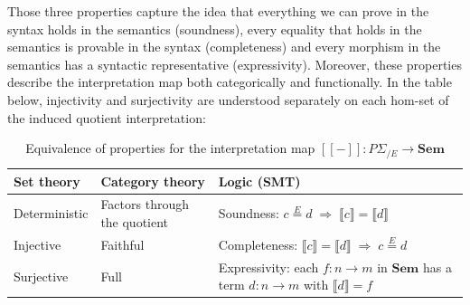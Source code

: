 Those three properties capture the idea that everything we can prove in the syntax holds in the semantics (soundness), every equality that holds in the semantics is provable in the syntax (completeness) and every morphism in the semantics has a syntactic representative (expressivity). Moreover, these properties describe the interpretation map both categorically and functionally. In the table below, injectivity and surjectivity are understood separately on each hom-set of the induced quotient interpretation:

\begin{table}[h!]
	\centering
	\caption{Equivalence of properties for the interpretation map
	$[\![{-}]\!] : P\Sigma_{/E} \to \mathbf{Sem}$}
	\label{tab:equivalences}
	\begin{tabular}{
			m{3.2cm}
			m{3.2cm}
			m{4.5cm}
		}
        \\
		\toprule
		\textbf{Set theory}      &
		\textbf{Category theory} &
		\textbf{Logic (SMT)}                                                                                     \\
		\midrule

		Deterministic &
		Factors through the quotient &
		Soundness: $c \overset{E}{=} d \;\Rightarrow\; \llbracket c\rrbracket = \llbracket d\rrbracket$ \\[6pt]

		Injective &
		Faithful                 &
		Completeness: $\llbracket c\rrbracket = \llbracket d\rrbracket \;\Rightarrow\; c \overset{E}{=} d$ \\[6pt]

		Surjective &
		Full                     &
		Expressivity: each $f:n\to m$ in $\mathbf{Sem}$ has a term $d:n\to m$ with $\llbracket d\rrbracket=f$ \\

		\bottomrule
	\end{tabular}
\end{table}

